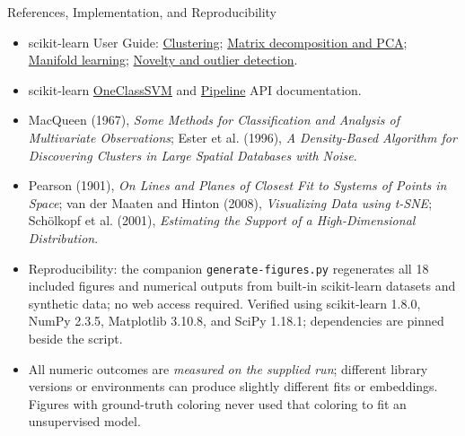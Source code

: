 \documentclass[aspectratio=169,10pt]{beamer}
\begin{document}
\begin{frame}{References, Implementation, and Reproducibility}
\scriptsize
\begin{itemize}
\item scikit-learn User Guide: \href{https://scikit-learn.org/stable/modules/clustering.html}{Clustering}; \href{https://scikit-learn.org/stable/modules/decomposition.html}{Matrix decomposition and PCA}; \href{https://scikit-learn.org/stable/modules/manifold.html}{Manifold learning}; \href{https://scikit-learn.org/stable/modules/outlier_detection.html}{Novelty and outlier detection}.
\item scikit-learn \href{https://scikit-learn.org/stable/modules/generated/sklearn.svm.OneClassSVM.html}{OneClassSVM} and \href{https://scikit-learn.org/stable/modules/generated/sklearn.pipeline.Pipeline.html}{Pipeline} API documentation.
\item MacQueen (1967), \emph{Some Methods for Classification and Analysis of Multivariate Observations}; Ester et al. (1996), \emph{A Density-Based Algorithm for Discovering Clusters in Large Spatial Databases with Noise}.
\item Pearson (1901), \emph{On Lines and Planes of Closest Fit to Systems of Points in Space}; van der Maaten and Hinton (2008), \emph{Visualizing Data using t-SNE}; Sch\"olkopf et al. (2001), \emph{Estimating the Support of a High-Dimensional Distribution}.
\item Reproducibility: the companion \texttt{generate-figures.py} regenerates all 18 included figures and numerical outputs from built-in scikit-learn datasets and synthetic data; no web access required. Verified using scikit-learn 1.8.0, NumPy 2.3.5, Matplotlib 3.10.8, and SciPy 1.18.1; dependencies are pinned beside the script.
\item All numeric outcomes are \emph{measured on the supplied run}; different library versions or environments can produce slightly different fits or embeddings. Figures with ground-truth coloring never used that coloring to fit an unsupervised model.
\end{itemize}
\end{frame}
\end{document}
